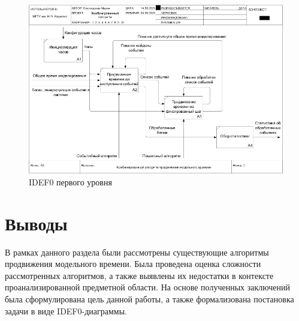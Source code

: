 \begin{figure}[h!btp]
	\centering
	\includegraphics[width=1\columnwidth]{inc/img/IDEF0-A1.png}
	\caption{IDEF0 первого уровня}
	\label{img:IDEF0-A1}	
\end{figure}

\section{Выводы}
В рамках данного раздела были рассмотрены существующие алгоритмы продвижения модельного времени. Была проведена оценка сложности рассмотренных алгоритмов, а также выявлены их недостатки в контексте проанализированной предметной области. На основе полученных заключений была сформулирована цель данной работы, а также формализована постановка задачи в виде IDEF0-диаграммы.
